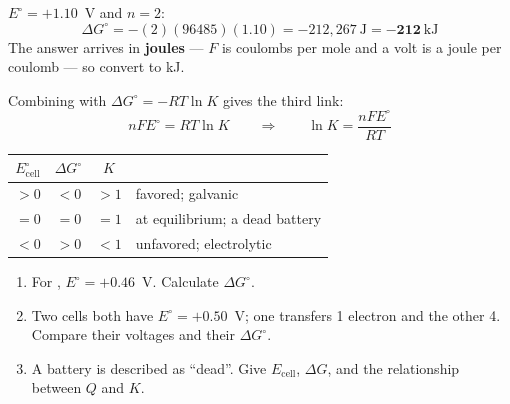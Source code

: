 \documentclass{apchem-notes}
\begin{document}
\begin{workedexample}
$E^\circ = +1.10$~V and $n = 2$:
\[ \Delta G^\circ = -(2)(96485)(1.10) = -212{,}267~\text{J}
   = \mathbf{-212}~\text{kJ} \]
The answer arrives in \textbf{joules} --- $F$ is coulombs per mole and a
volt is a joule per coulomb --- so convert to kJ.
\end{workedexample}

Combining with $\Delta G^\circ = -RT\ln K$ gives the third link:
\[ nFE^\circ = RT\ln K \qquad\Longrightarrow\qquad
   \ln K = \frac{nFE^\circ}{RT} \]

\begin{center}
\renewcommand{\arraystretch}{1.2}
\begin{tabular}{@{}cccl@{}}
\hline
$E^\circ_{\text{cell}}$ & $\Delta G^\circ$ & $K$ & \\
\hline
$> 0$ & $< 0$ & $> 1$ & favored; galvanic \\
$= 0$ & $= 0$ & $= 1$ & at equilibrium; a dead battery \\
$< 0$ & $> 0$ & $< 1$ & unfavored; electrolytic \\
\hline
\end{tabular}
\end{center}


\begin{enumerate}[leftmargin=*,itemsep=0.4em]
  \item For , $E^\circ = +0.46$~V. Calculate
        $\Delta G^\circ$. \workspace[2.2cm]
  \item Two cells both have $E^\circ = +0.50$~V; one transfers 1 electron
        and the other 4. Compare their voltages and their $\Delta G^\circ$.
  \item A battery is described as ``dead''. Give $E_{\text{cell}}$,
        $\Delta G$, and the relationship between $Q$ and $K$.
\end{enumerate}
\end{document}
